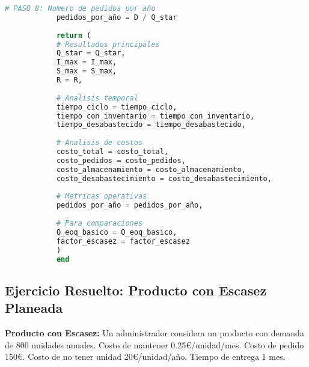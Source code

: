 \documentclass[12pt,a4paper]{book}
\begin{document}
\begin{tcolorbox}[enhanced,colback=verdeclaro,colframe=verdeprincipal,boxrule=3pt,arc=12pt,
		drop shadow,title={\Large\bfseries\color{white} \faExclamationTriangle\ EOQ CON ESCASEZ PLANEADA},breakable]
\begin{lstlisting}[language=Julia,basicstyle=\footnotesize\ttfamily]
			# PASO 8: Numero de pedidos por año
			pedidos_por_año = D / Q_star
			
			return (
			# Resultados principales
			Q_star = Q_star,
			I_max = I_max,
			S_max = S_max,
			R = R,
			
			# Analisis temporal
			tiempo_ciclo = tiempo_ciclo,
			tiempo_con_inventario = tiempo_con_inventario,
			tiempo_desabastecido = tiempo_desabastecido,
			
			# Analisis de costos
			costo_total = costo_total,
			costo_pedidos = costo_pedidos,
			costo_almacenamiento = costo_almacenamiento,
			costo_desabastecimiento = costo_desabastecimiento,
			
			# Metricas operativas
			pedidos_por_año = pedidos_por_año,
			
			# Para comparaciones
			Q_eoq_basico = Q_eoq_basico,
			factor_escasez = factor_escasez
			)
			end
		\end{lstlisting}
		
	\end{tcolorbox}
	
	\subsection{Ejercicio Resuelto: Producto con Escasez Planeada}
	
	\begin{tcolorbox}[enhanced,colback=naranjaclaro,colframe=naranjaacento,boxrule=2pt,arc=8pt,
		drop shadow,title={\bfseries\color{white} \faPuzzlePiece\ PROBLEMA CON DESABASTECIMIENTO}]
		
		\textbf{Producto con Escasez:} Un administrador considera un producto con demanda de 800 unidades anuales. Costo de mantener 0.25€/unidad/mes. Costo de pedido 150€. Costo de no tener unidad 20€/unidad/año. Tiempo de entrega 1 mes.
		
	\end{tcolorbox}
	
\end{document}

